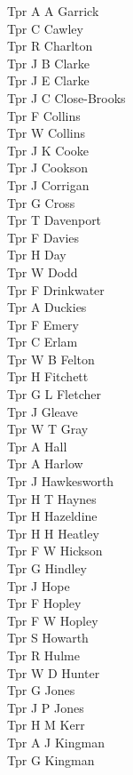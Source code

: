 \begin{multicols}{2}
  Tpr A A Garrick \\
  Tpr C Cawley \\
  Tpr R Charlton \\
  Tpr J B Clarke \\
  Tpr J E Clarke \\
  Tpr J C Close-Brooks \\
  Tpr F Collins \\
  Tpr W Collins \\
  Tpr J K Cooke \\
  Tpr J Cookson \\
  Tpr J Corrigan \\
  Tpr G Cross \\
  Tpr T Davenport \\
  Tpr F Davies \\
  Tpr H Day \\
  Tpr W Dodd \\
  Tpr F Drinkwater \\
  Tpr A Duckies \\
  Tpr F Emery \\
  Tpr C Erlam \\
  Tpr W B Felton \\
  Tpr H Fitchett \\
  Tpr G L Fletcher \\
  Tpr J Gleave \\
  Tpr W T Gray \\
  Tpr A Hall \\
  Tpr A Harlow \\
  Tpr J Hawkesworth \\
  Tpr H T Haynes \\
  Tpr H Hazeldine \\
  Tpr H H Heatley \\
  Tpr F W Hickson \\
  Tpr G Hindley \\
  Tpr J Hope \\
  Tpr F Hopley \\
  Tpr F W Hopley \\
  Tpr S Howarth \\
  Tpr R Hulme \\
  Tpr W D Hunter \\
  Tpr G Jones \\
  Tpr J P Jones \\
  Tpr H M Kerr \\
  Tpr A J Kingman \\
  Tpr G Kingman \\

\end{multicols}
